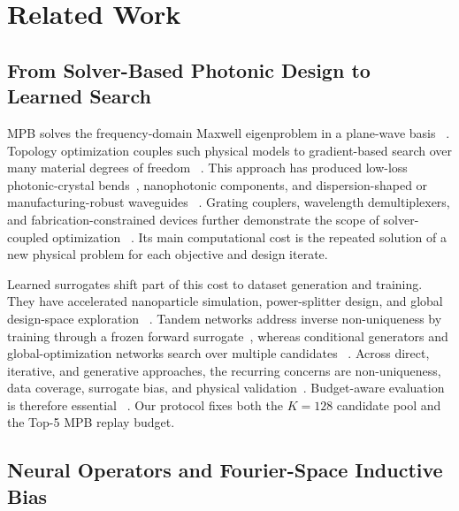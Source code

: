 
\section{Related Work}

\subsection{From Solver-Based Photonic Design to Learned Search}

MPB solves the frequency-domain Maxwell eigenproblem in a plane-wave basis
~\cite{johnson2001mpb}. Topology optimization couples such physical models to
gradient-based search over many material degrees of freedom
~\cite{molesky2018inverse}. This approach has produced low-loss photonic-crystal
bends~\cite{jensen2004systematic}, nanophotonic components, and
dispersion-shaped or manufacturing-robust waveguides
~\cite{jensen2011topology,wang2011robust}. Grating couplers, wavelength
demultiplexers, and fabrication-constrained devices further demonstrate the
scope of solver-coupled optimization
~\cite{piggott2014grating,piggott2015demultiplexer,piggott2017fabrication}.
Its main computational cost is the repeated solution of a new physical problem
for each objective and design iterate.

Learned surrogates shift part of this cost to dataset generation and training.
They have accelerated nanoparticle simulation, power-splitter design, and
global design-space exploration
~\cite{peurifoy2018nanophotonic,tahersima2019splitters,melati2019mapping}.
Tandem networks address inverse non-uniqueness by training through a frozen
forward surrogate~\cite{liu2018tandem}, whereas conditional generators and
global-optimization networks search over multiple candidates
~\cite{jiang2019glonet}. Across direct, iterative, and generative approaches,
the recurring concerns are non-uniqueness, data coverage, surrogate bias, and
physical validation~\cite{so2020inverse,ma2021deep,wiecha2021deep,
jiang2021evaluation}. Budget-aware evaluation is therefore essential
~\cite{ren2020benchmarking}. Our protocol fixes both the \(K=128\) candidate
pool and the Top-5 MPB replay budget.

\subsection{Neural Operators and Fourier-Space Inductive Bias}

